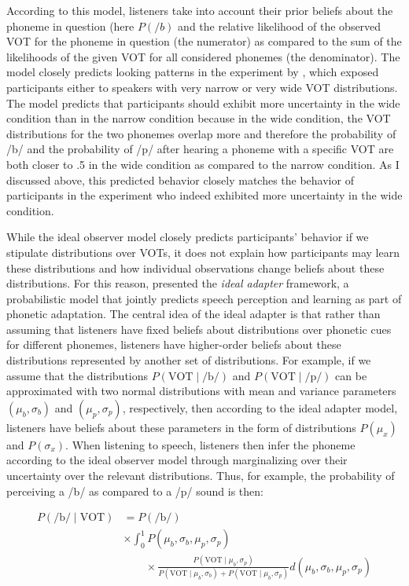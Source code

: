 \noindent According to this model, listeners take into account their prior beliefs about the phoneme in question (here $P(/b)$ and the relative likelihood of the observed VOT for the phoneme in question (the numerator) as compared to
the sum of the likelihoods of the given VOT for all considered phonemes (the denominator). The model closely predicts looking patterns in the experiment by 
\cite{Clayards2008}, which exposed participants either to speakers with very narrow or very wide VOT distributions.
 The model predicts that participants should exhibit more uncertainty in the wide condition than in the narrow condition because in the wide condition, the VOT distributions for the two phonemes
 overlap more and therefore the probability of /b/ and the probability of /p/ after hearing a phoneme with a specific VOT are both closer to .5 in the wide condition as compared to the narrow condition. 
 As I discussed above, this predicted behavior closely matches the behavior of participants in the experiment who indeed exhibited more uncertainty in the wide condition.
 
 While the ideal observer model closely predicts participants' behavior if we stipulate distributions over VOTs, it does not explain how participants may learn these distributions and how individual observations
 change  beliefs about these distributions. For this reason, \cite{KleinschmidtJaeger2015} presented the \textit{ideal adapter} framework, a probabilistic model that jointly predicts speech perception and learning
 as part of phonetic adaptation. The central idea of the ideal adapter is that rather than assuming that listeners have fixed beliefs about distributions over phonetic cues for different phonemes, listeners have higher-order
 beliefs about these distributions represented by another set of distributions. For example, if we assume that the distributions $P(\mbox{VOT}\mid \mbox{/b/})$ and $P(\mbox{VOT}\mid \mbox{/p/})$ can be approximated
 with two normal distributions with mean and variance parameters $(\mu_{b}, \sigma_{b})$ and $(\mu_{p}, \sigma_{p})$, respectively, then according to the ideal adapter model, listeners have beliefs about these parameters
 in the form of distributions $P(\mu_x)$ and $P(\sigma_x)$. When listening to speech, listeners then infer the phoneme according to the ideal observer model through marginalizing over their uncertainty over the relevant distributions.
 Thus, for example, the probability of perceiving a /b/ as compared to a /p/ sound is then:
 
\begin{align*}
  P(\mbox{/b/} \mid \mbox{VOT}) &=  P(\mbox{/b/}) \\ &  \times \int_{0}^1 P(\mu_b, \sigma_b, \mu_p, \sigma_p) \\ 
  & \qquad  \times \frac{P(\mbox{VOT}\mid \mu_b, \sigma_p)}{P(\mbox{VOT}\mid \mu_b, \sigma_b) + P(\mbox{VOT}\mid \mu_b, \sigma_p)} d (\mu_b, \sigma_b, \mu_p, \sigma_p)
\end{align*}

